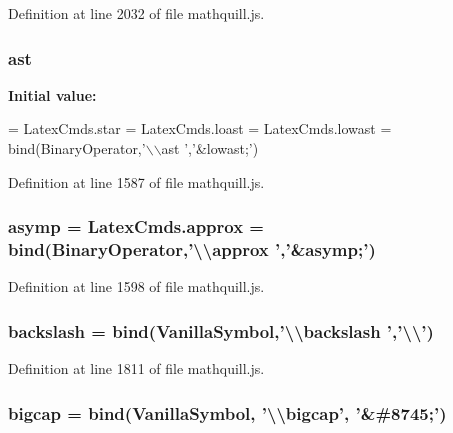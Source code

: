 Definition at line 2032 of file mathquill.\-js.

\subsubsection[{ast}]{ ast}\label{mathquill_8js_a06e1104f11a8a3627d70265ff7013d3d}
{\bfseries Initial value\-:}
\begin{DoxyCode}
= LatexCmds.star = LatexCmds.loast = LatexCmds.lowast =
  bind(BinaryOperator,\textcolor{stringliteral}{'\(\backslash\)\(\backslash\)ast '},\textcolor{stringliteral}{'&lowast;'})
\end{DoxyCode}


Definition at line 1587 of file mathquill.\-js.

\subsubsection[{asymp}]{ asymp = Latex\-Cmds.\-approx = {\bf bind}({\bf Binary\-Operator},'\textbackslash{}\textbackslash{}approx ','\&asymp;')}\label{mathquill_8js_a2fd8a907380d921b6c91b722603a2060}


Definition at line 1598 of file mathquill.\-js.

\subsubsection[{backslash}]{ backslash = {\bf bind}({\bf Vanilla\-Symbol},'\textbackslash{}\textbackslash{}backslash ','\textbackslash{}\textbackslash{}')}\label{mathquill_8js_abdf4f6fe4614168b7966f85b123012a7}


Definition at line 1811 of file mathquill.\-js.

\subsubsection[{bigcap}]{ bigcap = {\bf bind}({\bf Vanilla\-Symbol}, '\textbackslash{}\textbackslash{}bigcap', '\&\#8745;')}\label{mathquill_8js_a7126b6f17fa26cc7ba8b5c89dfe48b22}


